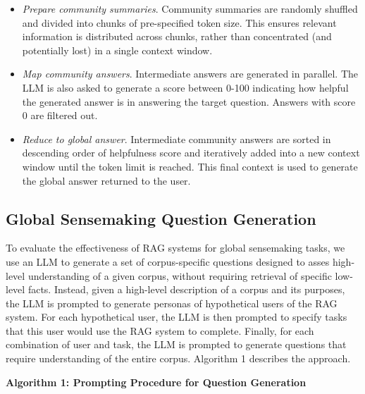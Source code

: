 \documentclass{article}
\begin{document}
\begin{itemize}
    \item \emph{Prepare community summaries}. Community summaries are randomly shuffled and divided into chunks of pre-specified token size.  This ensures relevant information is distributed across chunks, rather than concentrated (and potentially lost) in a single context window.
    \item \emph{Map community answers}. Intermediate answers are generated in parallel. The LLM is also asked to generate a score between 0-100 indicating how helpful the generated answer is in answering the target question. Answers with score 0 are filtered out.
    \item \emph{Reduce to global answer}. Intermediate community answers are sorted in descending order of helpfulness score and iteratively added into a new context window until the token limit is reached. This final context is used to generate the global answer returned to the user.
\end{itemize}

\subsection{Global Sensemaking Question Generation}
To evaluate the effectiveness of RAG systems for global sensemaking tasks, we use an LLM to generate a set of corpus-specific questions designed to asses high-level understanding of a given corpus, without requiring retrieval of specific low-level facts.
Instead, given a high-level description of a corpus and its purposes, the LLM is prompted to generate personas of hypothetical users of the RAG system.
For each hypothetical user, the LLM is then prompted to specify tasks that this user would use the RAG system to complete.
Finally, for each combination of user and task, the LLM is prompted to generate questions that require understanding of the entire corpus. Algorithm 1 describes the approach.

\noindent\hrulefill

\vspace{-5px}
\textbf{Algorithm 1: Prompting Procedure for Question Generation}

\vspace{-10px}
\noindent\hrulefill
\end{document}
